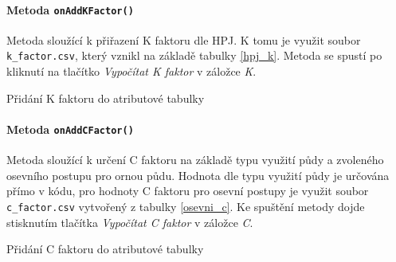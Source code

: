 \paragraph{Metoda \texttt{onAddKFactor()}} Metoda sloužící k přiřazení
K faktoru dle HPJ. K tomu je využit soubor \texttt{k\_factor.csv},
který vznikl na základě tabulky \ref{hpj_k}. Metoda se spustí po
kliknutí na tlačítko \textit{Vypočítat K faktor} v záložce \textit{K}.
\begin{algorithm}
\caption{Přidání K faktoru do atributové tabulky}
\label{alg:onAddKFactor}
    \begin{algorithmic}[1] 
 
 
    	\ENDIF {} 
 \ELSE {}
    		\ENDIF
    	\ENDFOR {}
    \end{algorithmic}
\end{algorithm}

\paragraph{Metoda \texttt{onAddCFactor()}} Metoda sloužící k určení C
faktoru na základě typu využití půdy a zvoleného osevního postupu pro
ornou půdu. Hodnota dle typu využití půdy je určována přímo v kódu,
pro hodnoty C faktoru pro osevní postupy je využit soubor
\texttt{c\_factor.csv} vytvořený z tabulky \ref{osevni_c}. Ke spuštění
metody dojde stisknutím tlačítka \textit{Vypočítat C faktor} v záložce
\textit{C}.
\begin{algorithm}
\caption{Přidání C faktoru do atributové tabulky}
\label{alg:onAddKFactor}
    \begin{algorithmic}[1] 
  
 
      	\ENDIF {}  
 
    		\ENDIF
    	\ENDFOR {}
    \end{algorithmic}
\end{algorithm} \FloatBarrier
